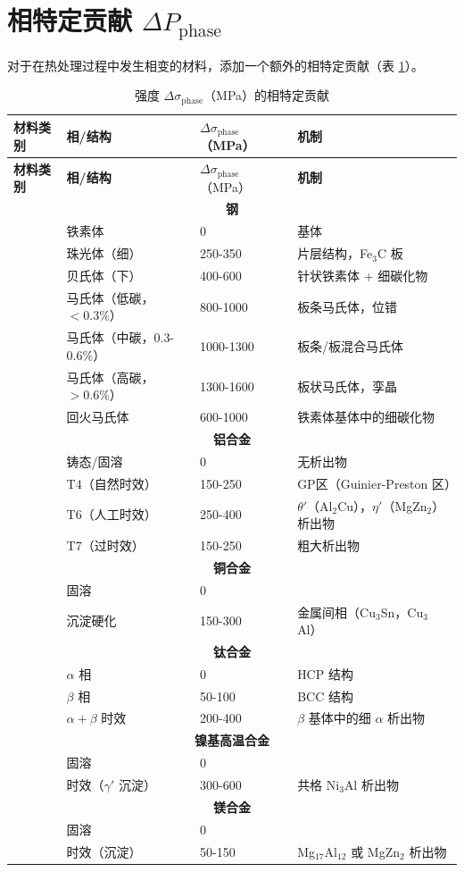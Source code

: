 \documentclass[12pt,a4paper]{article}
\begin{document}
	\section{相特定贡献 $\Delta P_{\text{phase}}$}
	对于在热处理过程中发生相变的材料，添加一个额外的相特定贡献（表 \ref{tab:phase_contrib}）。
	
	\begin{longtable}{p{3.5cm} p{3.0cm} p{3.0cm} p{4cm}}
		\caption{强度 $\Delta\sigma_{\text{phase}}$（MPa）的相特定贡献}\label{tab:phase_contrib}\\
		\toprule
		\textbf{材料类别} & \textbf{相/结构} & $\Delta\sigma_{\text{phase}}$（MPa） & \textbf{机制} \\
		\midrule
		\endfirsthead
		\toprule
		\textbf{材料类别} & \textbf{相/结构} & $\Delta\sigma_{\text{phase}}$（MPa） & \textbf{机制} \\
		\midrule
		\endhead
		\multicolumn{4}{c}{\textbf{钢}} \\
		& 铁素体 & 0 & 基体 \\
		& 珠光体（细） & 250-350 & 片层结构，Fe$_3$C 板 \\
		& 贝氏体（下） & 400-600 & 针状铁素体 + 细碳化物 \\
		& 马氏体（低碳，$<0.3\%$） & 800-1000 & 板条马氏体，位错 \\
		& 马氏体（中碳，0.3-0.6\%） & 1000-1300 & 板条/板混合马氏体 \\
		& 马氏体（高碳，$>0.6\%$） & 1300-1600 & 板状马氏体，孪晶 \\
		& 回火马氏体 & 600-1000 & 铁素体基体中的细碳化物 \\
		\hline
		\multicolumn{4}{c}{\textbf{铝合金}} \\
		& 铸态/固溶 & 0 & 无析出物 \\
		& T4（自然时效） & 150-250 & GP区（Guinier-Preston 区） \\
		& T6（人工时效） & 250-400 & $\theta'$（Al$_2$Cu），$\eta'$（MgZn$_2$）析出物 \\
		& T7（过时效） & 150-250 & 粗大析出物 \\
		\hline
		\multicolumn{4}{c}{\textbf{铜合金}} \\
		& 固溶 & 0 & \\
		& 沉淀硬化 & 150-300 & 金属间相（Cu$_3$Sn，Cu$_3$Al） \\
		\hline
		\multicolumn{4}{c}{\textbf{钛合金}} \\
		& $\alpha$ 相 & 0 & HCP 结构 \\
		& $\beta$ 相 & 50-100 & BCC 结构 \\
		& $\alpha+\beta$ 时效 & 200-400 & $\beta$ 基体中的细 $\alpha$ 析出物 \\
		\hline
		\multicolumn{4}{c}{\textbf{镍基高温合金}} \\
		& 固溶 & 0 & \\
		& 时效（$\gamma'$ 沉淀） & 300-600 & 共格 Ni$_3$Al 析出物 \\
		\hline
		\multicolumn{4}{c}{\textbf{镁合金}} \\
		& 固溶 & 0 & \\
		& 时效（沉淀） & 50-150 & Mg$_{17}$Al$_{12}$ 或 MgZn$_2$ 析出物 \\
		\bottomrule
	\end{longtable}
	
\end{document}
